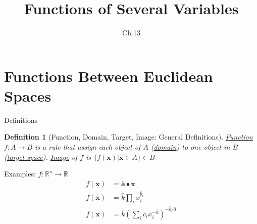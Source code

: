 \documentclass[a4paper,11pt]{article}
\author[조남운]{\mail}
\title{Functions of Several Variables}
\subtitle{Ch.13}
\newtheorem{defn}{Definition}
\begin{document}
	
\maketitle


\section{Functions Between Euclidean Spaces} %
\label{sec:functions_between_euclidean_spaces}
\begin{frame}[t]{Definitions}
	\begin{defn}
		[Function, Domain, Target, Image: General Definitions]
		\uline{Function} $f:A\rightarrow B$ is a rule that assign each object of $A$ (\uline{domain}) to one object in $B$ (\uline{target space}). \uline{Image} of $f$ is $\{f(\mathbf{x})\vert \mathbf{x}\in A\}\in B$
	\end{defn}
	\begin{block}
		{Examples: $f:\mathbb{R}^n\rightarrow\mathbb{R}$}
		\begin{align*}
			f(\mathbf{x})&=\bar{\mathbf{a}}\bullet\mathbf{x}\tag{Linear}\\
			f(\mathbf{x})&=\bar k \prod_i x_i^{\bar b_i} \tag{Cobb-Douglas}\\
			f(\mathbf{x})&=\bar k \left(\sum_i \bar c_i x_i ^{-\bar a}\right)^{-\bar b / \bar a} \tag{CES}
		\end{align*}
	\end{block}
\end{frame}
\end{document}
